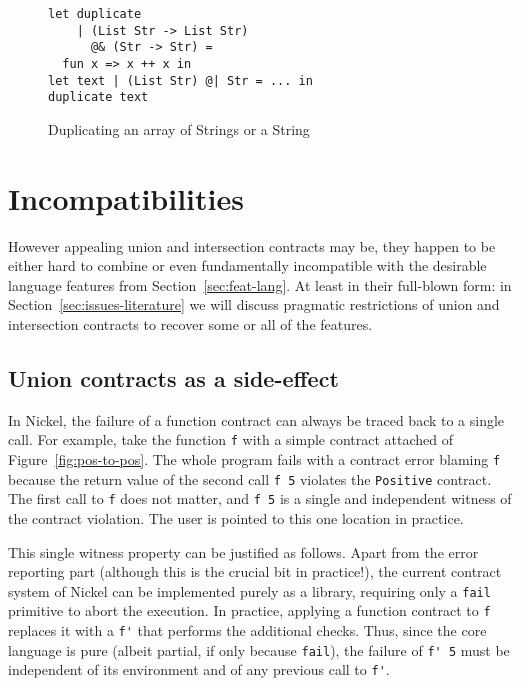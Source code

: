 \documentclass[sigplan,10pt]{acmart}
\newcommand{\unsure}[2][1=]{}
\newcommand{\nickel}[1]{\lstinline[language=nickel]{#1}}
\begin{document}
\begin{figure}[h]
\begin{lstlisting}[language=nickel]
let duplicate
    | (List Str -> List Str)
      @& (Str -> Str) =
  fun x => x ++ x in
let text | (List Str) @| Str = ... in
duplicate text
\end{lstlisting}
\caption{Duplicating an array of Strings or a String}
\label{fig:intersection-overloading-ex}
\end{figure}

\section{Incompatibilities}
\label{sec:issues-sem}

However appealing union and intersection contracts may be, they happen to be
either hard to combine or even fundamentally incompatible with the desirable
language features from Section~\ref{sec:feat-lang}. At least in their full-blown
form: in Section~\ref{sec:issues-literature} we will discuss pragmatic
restrictions of union and intersection contracts to recover some or all of the
features.

\subsection{Union contracts as a side-effect}

In \unsure{Maybe specify its Nickel without Union or inter}Nickel,
the failure of a function contract can always be traced back to a
single call. For example, take the function \nickel{f} with a simple contract
attached of Figure~\ref{fig:pos-to-pos}. The whole program fails with a contract
error blaming \nickel{f} because the return value of the second call \nickel{f 5}
violates the \nickel{Positive} contract. The first call to \nickel{f} does
not matter, and \nickel{f 5} is a single and independent witness of the contract
violation. The user is pointed to this one location in practice.

This single witness property can be justified as follows. Apart from the error
reporting part (although this is the crucial bit in practice!), the current
contract system of Nickel can be implemented purely as a library, requiring only
a \nickel{fail} primitive to abort the execution. In practice, applying a
function contract to \nickel{f} replaces it with a \nickel{f'} that performs the
additional checks. Thus, since the core language is pure (albeit
partial, if only because \nickel{fail}), the failure of \nickel{f' 5}
must be independent of its environment and of any previous call to \nickel{f'}.
\end{document}
